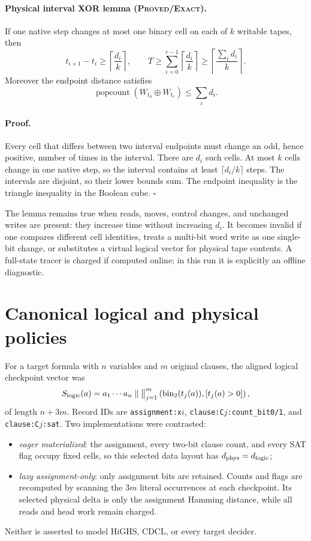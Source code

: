 \documentclass[11pt]{article}
\newcommand{\Status}[1]{\textsc{#1}}
\begin{document}
\paragraph{Physical interval XOR lemma (\Status{Proved/Exact}).}
If one native step changes at most one binary cell on each of $k$ writable
tapes, then
\[
 t_{i+1}-t_i\ge \left\lceil\frac{d_i}{k}\right\rceil,
 \qquad
 T\ge\sum_{i=0}^{r-1}\left\lceil\frac{d_i}{k}\right\rceil
 \ge \left\lceil\frac{\sum_i d_i}{k}\right\rceil.
\]
Moreover the endpoint distance satisfies
\[
 \operatorname{popcount}(W_{t_0}\oplus W_{t_r})\le\sum_i d_i.
\]

\paragraph{Proof.}
Every cell that differs between two interval endpoints must change an odd,
hence positive, number of times in the interval.  There are $d_i$ such cells.
At most $k$ cells change in one native step, so the interval contains at least
$\lceil d_i/k\rceil$ steps.  The intervals are disjoint, so their lower bounds
sum.  The endpoint inequality is the triangle inequality in the Boolean cube.
\hfill$\square$

The lemma remains true when reads, moves, control changes, and unchanged writes
are present: they increase time without increasing $d_i$.  It becomes invalid
if one compares different cell identities, treats a multi-bit word write as one
single-bit change, or substitutes a virtual logical vector for physical tape
contents.  A full-state tracer is charged if computed online; in this run it is
explicitly an offline diagnostic.

\section{Canonical logical and physical policies}
For a target formula with $n$ variables and $m$ original clauses, the aligned
logical checkpoint vector was
\[
 S_{\rm logic}(a)=
  a_1\cdots a_n\;\Vert\;
  \big\Vert_{j=1}^{m}
   \left(\operatorname{bin}_2(t_j(a)),[t_j(a)>0]\right),
\]
of length $n+3m$.  Record IDs are
\texttt{assignment:x\(i\)}, \texttt{clause:C\(j\):count\_bit0/1}, and
\texttt{clause:C\(j\):sat}.  Two implementations were contrasted:
\begin{itemize}
\item \emph{eager materialized}: the assignment, every two-bit clause count,
and every SAT flag occupy fixed cells, so this selected data layout has
$d_{\rm phys}=d_{\rm logic}$;
\item \emph{lazy assignment-only}: only assignment bits are retained.  Counts
and flags are recomputed by scanning the $3m$ literal occurrences at each
checkpoint.  Its selected physical delta is only the assignment Hamming
distance, while all reads and head work remain charged.
\end{itemize}
Neither is asserted to model HiGHS, CDCL, or every target decider.
\end{document}
